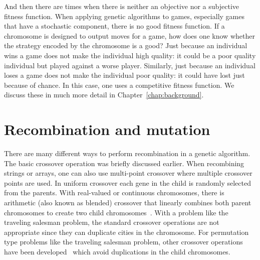 And then there are times when there is neither an objective nor a subjective
fitness function. When applying genetic algorithms to games, especially games
that have a stochastic component, there is no good fitness function. If a
chromosome is designed to output moves for a game, how does one know whether
the strategy encoded by the chromosome is a good? Just because an individual
wins a game does not make the individual high quality: it could be a poor
quality individual but played against a worse player. Similarly, just because an
individual loses a game does not make the individual poor quality: it could have
lost just because of chance. In this case, one uses a competitive fitness
function. We discuss these in much more detail in Chapter~\ref{chap:background}.

\section{Recombination and mutation} \label{2-recombination}

There are many different ways to perform recombination in a genetic algorithm.
The basic crossover operation was briefly discussed earlier. When recombining
strings or arrays, one can also use multi-point crossover where multiple
crossover points are used. In uniform crossover each gene in the child is
randomly selected from the parents. With real-valued or continuous chromosomes,
there is arithmetic (also known as blended) crossover that linearly combines
both parent chromosomes to create two child
chromosomes~\cite{haupt2004practical}. With a problem like the traveling
salesman problem, the standard crossover operations are not appropriate since
they can duplicate cities in the chromosome. For permutation type problems like
the traveling salesman problem, other crossover operations have been
developed~\cite{goldberg1989genetic} which avoid duplications in the child
chromosomes. 
